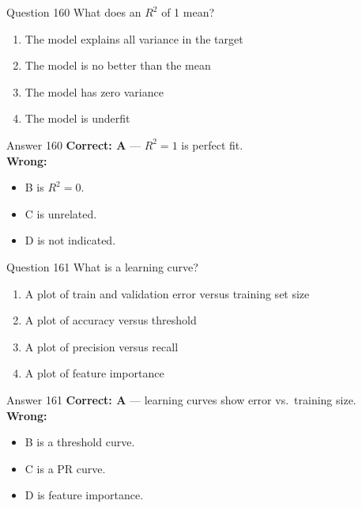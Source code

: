 \documentclass[aspectratio=169,11pt]{beamer}
\begin{document}
	\begin{frame}{Question 160}
		What does an $R^2$ of 1 mean?
		\begin{enumerate}[label=\Alph*.]
			\item The model explains all variance in the target
			\item The model is no better than the mean
			\item The model has zero variance
			\item The model is underfit
		\end{enumerate}
	\end{frame}
	\begin{frame}{Answer 160}
		\textbf{Correct: A} --- $R^2=1$ is perfect fit.\\
		\vspace{0.5em}
		\textbf{Wrong:}
		\begin{itemize}
			\item B is $R^2=0$.
			\item C is unrelated.
			\item D is not indicated.
		\end{itemize}
	\end{frame}
	
	\begin{frame}{Question 161}
		What is a learning curve?
		\begin{enumerate}[label=\Alph*.]
			\item A plot of train and validation error versus training set size
			\item A plot of accuracy versus threshold
			\item A plot of precision versus recall
			\item A plot of feature importance
		\end{enumerate}
	\end{frame}
	\begin{frame}{Answer 161}
		\textbf{Correct: A} --- learning curves show error vs.\ training size.\\
		\vspace{0.5em}
		\textbf{Wrong:}
		\begin{itemize}
			\item B is a threshold curve.
			\item C is a PR curve.
			\item D is feature importance.
		\end{itemize}
	\end{frame}
	
\end{document}
